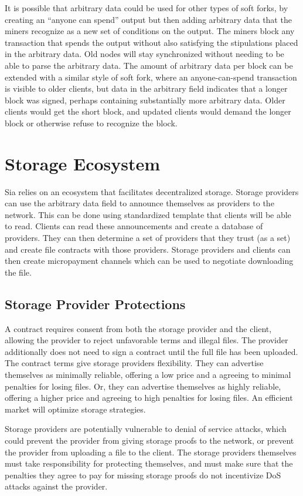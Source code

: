 \documentclass[twocolumn]{article}
\begin{document}
It is possible that arbitrary data could be used for other types of soft forks, by creating an ``anyone can spend'' output but then adding arbitrary data that the miners recognize as a new set of conditions on the output.
The miners block any transaction that spends the output without also satisfying the stipulations placed in the arbitrary data.
Old nodes will stay synchronized without needing to be able to parse the arbitrary data.
The amount of arbitrary data per block can be extended with a similar style of soft fork, where an anyone-can-spend transaction is visible to older clients, but data in the arbitrary field indicates that a longer block was signed, perhaps containing substantially more arbitrary data.
Older clients would get the short block, and updated clients would demand the longer block or otherwise refuse to recognize the block.

\section{Storage Ecosystem}
Sia relies on an ecosystem that facilitates decentralized storage.
Storage providers can use the arbitrary data field to announce themselves as providers to the network.
This can be done using standardized template that clients will be able to read.
Clients can read these announcements and create a database of providers.
They can then determine a set of providers that they trust (as a set) and create file contracts with those providers.
Storage providers and clients can then create micropayment channels \cite{mpc} which can be used to negotiate downloading the file.

\subsection{Storage Provider Protections}
A contract requires consent from both the storage provider and the client, allowing the provider to reject unfavorable terms and illegal files.
The provider additionally does not need to sign a contract until the full file has been uploaded.
The contract terms give storage providers flexibility.
They can advertise themselves as minimally reliable, offering a low price and a agreeing to minimal penalties for losing files.
Or, they can advertise themselves as highly reliable, offering a higher price and agreeing to high penalties for losing files.
An efficient market will optimize storage strategies.

Storage providers are potentially vulnerable to denial of service attacks, which could prevent the provider from giving storage proofs to the network, or prevent the provider from uploading a file to the client.
The storage providers themselves must take responsibility for protecting themselves, and must make sure that the penalties they agree to pay for missing storage proofs do not incentivize DoS attacks against the provider.
\end{document}
